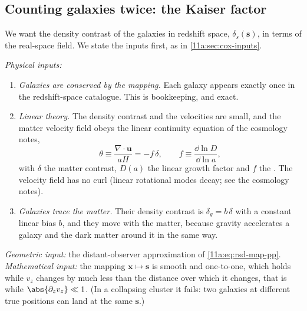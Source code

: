 \subsection{Counting galaxies twice: the Kaiser factor}
\label{11a:sec:kaiser}

We want the density contrast of the galaxies in redshift space,
$\delta_s(\bm s)$, in terms of the real-space field. We state the inputs first,
as in \cref{11a:sec:cox-inputs}.

\emph{Physical inputs:}
\begin{enumerate}[label=(K\arabic*),leftmargin=2.6em,itemsep=1pt]
  \item \emph{Galaxies are conserved by the mapping.} Each galaxy appears exactly
        once in the redshift-space catalogue. This is bookkeeping, and exact.
  \item \emph{Linear theory.} The density contrast and the velocities are small,
        and the matter velocity field obeys the linear continuity equation of the
        cosmology notes,
        \begin{equation}
          \theta\equiv\frac{\nabla\cdot\bm u}{aH}=-f\,\delta,\qquad
          f\equiv\frac{\dd\ln D}{\dd\ln a},
          \label{11a:eq:theta}
        \end{equation}
        with $\delta$ the matter contrast, $D(a)$ the linear growth factor
         and
        $f$ the . The velocity field has no curl (linear
        rotational modes decay; see the cosmology notes).
  \item \emph{Galaxies trace the matter.} Their density contrast is
        $\delta_g=b\,\delta$ with a constant linear bias $b$, and they move with
        the matter, because gravity accelerates a galaxy and the dark matter
        around it in the same way.
\end{enumerate}
\emph{Geometric input:} the distant-observer approximation of
\eqref{11a:eq:rsd-map-pp}. \emph{Mathematical input:} the mapping
$\bm x\mapsto\bm s$ is smooth and one-to-one, which holds while $v_z$ changes
by much less than the distance over which it changes, that is while
$\abs{\partial_zv_z}\ll1$. (In a collapsing cluster it fails: two galaxies at
different true positions can land at the same $\bm s$.)

